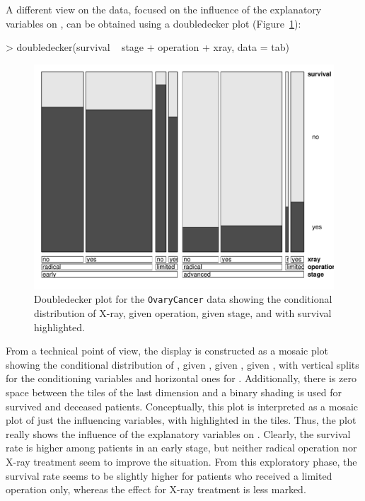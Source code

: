 \documentclass{Z}
\newcommand{\data}[1]{\texttt{#1}}
\begin{document}
A different view on the data, focused on the influence of the
explanatory variables on ,
can be obtained using a doubledecker plot (Figure~\ref{fig:ocdoubledecker}):

\begin{Schunk}
\begin{Sinput}
> doubledecker(survival ~ stage + operation + xray, data = tab)
\end{Sinput}
\end{Schunk}

\begin{figure}[h]
\begin{center}
\includegraphics{strucplot-ocdoubledecker}
\caption{Doubledecker plot for the \data{OvaryCancer} data showing the
 conditional distribution of X-ray, given operation, given stage, and with
 survival highlighted.}
\label{fig:ocdoubledecker}
\end{center}
\end{figure}

\noindent From a technical point of view, the display is constructed as a mosaic plot
showing the conditional distribution of , given , 
given , given , 
with vertical splits for the conditioning variables and horizontal ones for
. 
Additionally, there is zero space between the tiles of the last dimension and
a binary shading is used for survived and deceased patients.
Conceptually, this plot is interpreted as a mosaic plot of just the influencing
variables, with  highlighted in the tiles. Thus, the plot really shows
the influence of the explanatory variables on . Clearly, the survival
rate is higher among patients in an early stage, but neither radical operation 
nor X-ray treatment seem to improve the situation. From this exploratory
phase, the survival rate seems to be slightly higher for patients who
received a limited operation only, whereas the effect for X-ray
treatment is less marked.
\end{document}
